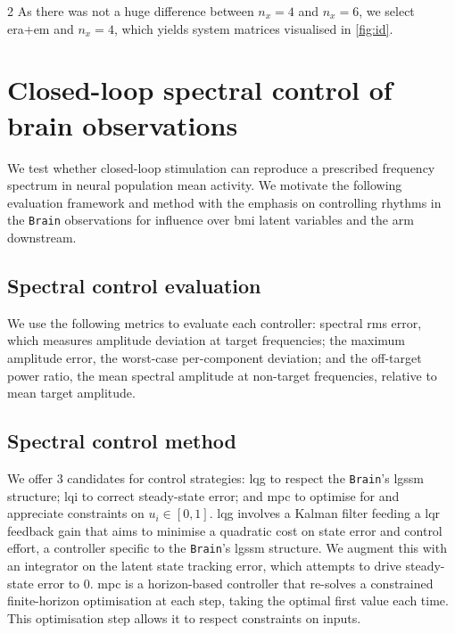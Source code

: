 \documentclass[a4paper, 10pt]{article}
\let\cite\supercite
\newcommand{\Brain}{\texttt{Brain}\xspace}
\newcommand{\LGSSM}{\ac{lgssm}\xspace}
\newcommand{\BMI}{\ac{bmi}\xspace}
\newcommand{\LQG}{\ac{lqg}\xspace}
\newcommand{\MPC}{\ac{mpc}\xspace}
\begin{document}
\begin{multicols*}{2}
  As there was not a huge difference between $n_x=4$ and $n_x=6$, we select
  \ac{era}+\ac{em} and $n_x=4$, which yields system matrices visualised in
  \autoref{fig:id}.


  \section*{Closed-loop spectral control of brain observations}

  We test whether closed-loop stimulation can reproduce a prescribed frequency
  spectrum in neural population mean activity. We motivate the following
  evaluation framework and method with the emphasis on controlling rhythms in
  the \Brain observations for influence over \BMI latent variables and the arm
  downstream.

  \subsection*{Spectral control evaluation}

  We use the following metrics to evaluate each controller: spectral \ac{rms}
  error, which measures amplitude deviation at target frequencies; the maximum
  amplitude error, the worst-case per-component deviation; and the off-target
  power ratio, the mean spectral amplitude at non-target frequencies, relative
  to mean target amplitude.

  \subsection*{Spectral control method}

  We offer 3 candidates for control strategies: \ac{lqg} to respect the \Brain's
  \LGSSM structure; \ac{lqi} to correct steady-state error; and \ac{mpc} to
  optimise for and appreciate constraints on $u_i \in [0,1]$. \LQG involves a
  Kalman filter \cite{kalmanNewApproachLinear1960} feeding a \ac{lqr} feedback
  gain that aims to minimise a quadratic cost on state error and control effort,
  a controller specific to the \Brain's \LGSSM structure. We augment this with
  an integrator on the latent state tracking error, which attempts to drive
  steady-state error to 0. \MPC is a horizon-based controller that re-solves a
  constrained finite-horizon optimisation at each step, taking the optimal first
  value each time. This optimisation step allows it to respect constraints on
  inputs.


\end{multicols*}
\end{document}
